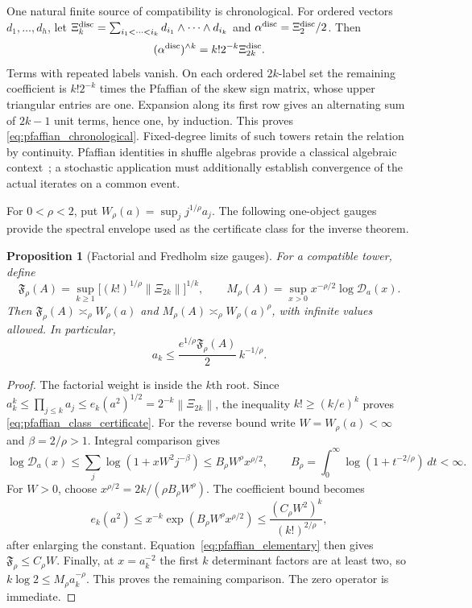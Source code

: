 \documentclass[11pt,a4paper]{amsart}
\numberwithin{equation}{section}
\newtheorem{proposition}[theorem]{Proposition}
\theoremstyle{definition}
\theoremstyle{remark}
\newcommand{\norm}[1]{\left\lVert#1\right\rVert}
\begin{document}
One natural finite source of compatibility is chronological. For ordered vectors $d_1,\ldots,d_h$, let
$\Xi_k^{\rm disc}=\sum_{i_1<\cdots<i_k}d_{i_1}\wedge\cdots\wedge d_{i_k}$ and $\alpha^{\rm disc}=\Xi_2^{\rm disc}/2$. Then
\begin{equation}\label{eq:pfaffian_chronological}
 (\alpha^{\rm disc})^{\wedge k}=k!2^{-k}\Xi_{2k}^{\rm disc}.
\end{equation}
Terms with repeated labels vanish. On each ordered $2k$-label set the remaining coefficient is $k!2^{-k}$ times the Pfaffian of the skew sign matrix, whose upper triangular entries are one. Expansion along its first row gives an alternating sum of $2k-1$ unit terms, hence one, by induction. This proves \eqref{eq:pfaffian_chronological}. Fixed-degree limits of such towers retain the relation by continuity. Pfaffian identities in shuffle algebras provide a classical algebraic context~\cite{LuqueThibon}; a stochastic application must additionally establish convergence of the actual iterates on a common event.

For $0<\rho<2$, put $W_\rho(a)=\sup_jj^{1/\rho}a_j$. The following one-object gauges provide the spectral envelope used as the certificate class for the inverse theorem.
\begin{proposition}[Factorial and Fredholm size gauges]\label{prop:pfaffian_gauges}
For a compatible tower, define
\[
 \mathfrak F_\rho(A)=\sup_{k\ge1}
       \big[(k!)^{1/\rho}\norm{\Xi_{2k}}\big]^{1/k},\qquad
 M_\rho(A)=\sup_{x>0}x^{-\rho/2}\log\mathscr D_a(x).
\]
Then $\mathfrak F_\rho(A)\asymp_\rho W_\rho(a)$ and
$M_\rho(A)\asymp_\rho W_\rho(a)^\rho$, with infinite values allowed. In particular,
\begin{equation}\label{eq:pfaffian_class_certificate}
 a_k\le \frac{e^{1/\rho}\mathfrak F_\rho(A)}2\,k^{-1/\rho}.
\end{equation}
\end{proposition}
\begin{proof}
The factorial weight is inside the $k$th root. Since
$a_k^k\le\prod_{j\le k}a_j\le e_k(a^2)^{1/2}=2^{-k}\norm{\Xi_{2k}}$,
the inequality $k!\ge(k/e)^k$ proves \eqref{eq:pfaffian_class_certificate}.
For the reverse bound write $W=W_\rho(a)<\infty$ and $\beta=2/\rho>1$. Integral comparison gives
\[
 \log\mathscr D_a(x)\le\sum_j\log(1+xW^2j^{-\beta})
 \le B_\rho W^\rho x^{\rho/2},\qquad
 B_\rho=\int_0^\infty\log(1+t^{-2/\rho})\,dt<\infty.
\]
For $W>0$, choose $x^{\rho/2}=2k/(\rho B_\rho W^\rho)$. The coefficient bound becomes
\[
 e_k(a^2)\le x^{-k}\exp(B_\rho W^\rho x^{\rho/2})
 \le\frac{(C_\rho W^2)^k}{(k!)^{2/\rho}},
\]
after enlarging the constant. Equation~\eqref{eq:pfaffian_elementary} then gives $\mathfrak F_\rho\le C_\rho W$. Finally, at $x=a_k^{-2}$ the first $k$ determinant factors are at least two, so
$k\log2\le M_\rho a_k^{-\rho}$. This proves the remaining comparison. The zero operator is immediate.
\end{proof}
\end{document}
